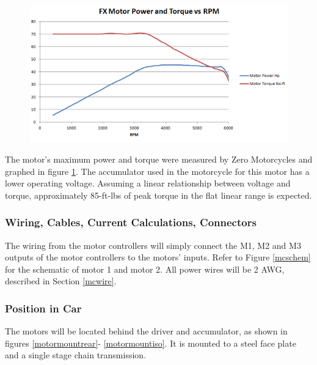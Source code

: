 \documentclass{article}
\begin{document}
            
            
            \begin{figure}[H]
                \centering
                \includegraphics[width = 0.75 \textwidth]{fx-motor-power-torque}
                \caption{}
                \label{motorplot}
            \end{figure}
            
            The motor's maximum power and torque were measured by Zero Motorcycles and graphed in figure \ref{motorplot}. The accumulator used in the motorcycle for this motor has a lower operating voltage. Assuming a linear relationship between voltage and torque, approximately 85-ft-lbs of peak torque in the flat linear range is expected.

        \subsubsection{Wiring, Cables, Current Calculations, Connectors} \label{motorswiring}

            
            The wiring from the motor controllers will simply connect the M1, M2 and M3 outputs of the motor controllers to the motors' inputs. Refer to Figure \ref{mcschem} for the schematic of motor 1 and motor 2. All power wires will be 2 AWG, described in Section \ref{mcwire}. 

        \subsubsection{Position in Car}

            The motors will be located behind the driver and accumulator, as shown in figures \ref{motormountrear}- \ref{motormountiso}. It is mounted to a steel face plate and a single stage chain transmission.
            
\end{document}

